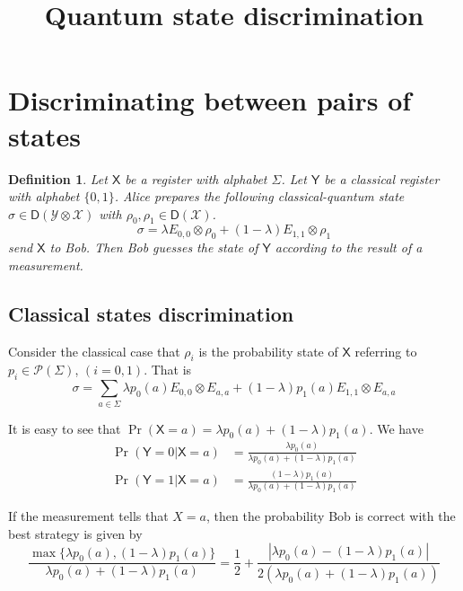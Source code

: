 \documentclass[aps,pra,onecolumn,notitlepage,superscriptaddress]{revtex4-1}
\newcommand{\reg}[1]{\mathsf{#1}}
\newcommand{\spc}[1]{\mathcal{#1}}
\newcommand{\D}{\mathsf{D}}
\newtheorem{defi}{Definition}
\begin{document}
    \title{Quantum state discrimination}
    \author{}
    \maketitle

    \section{Discriminating between pairs of states}
    \begin{defi}
        Let $\reg{X}$ be a register with alphabet $\Sigma$. Let $\reg{Y}$ be a classical register with alphabet $\{0,1\}$.
        Alice prepares the following classical-quantum state $\sigma \in \D( \spc Y \otimes \spc X )$ with $\rho_0, \rho_1 \in \D(\spc X)$.
        \begin{equation}
            \sigma = \lambda E_{0,0} \otimes \rho_0 + (1-\lambda) E_{1,1} \otimes \rho_1
        \end{equation}
       send $\reg X$ to Bob. Then Bob guesses the state of $\reg{Y}$ according to the result of a measurement.
    \end{defi}
    
    \subsection{Classical states discrimination}
    Consider the classical case that $\rho_i$ is the probability state of $\reg{X}$ referring to $p_i \in \spc{P}(\Sigma)$, $(i=0,1)$. That is
    \begin{equation}
        \sigma = \sum_{a \in \Sigma} \lambda p_0(a) E_{0,0} \otimes E_{a,a} + (1-\lambda) p_1(a) E_{1,1} \otimes E_{a,a}
    \end{equation}

    It is easy to see that $\Pr(\reg{X} = a) = \lambda p_0(a) + (1-\lambda)p_1(a)$. We have
    \begin{align}
        \Pr(\reg{Y} = 0 | \reg{X} = a) &= \frac{\lambda p_0(a)}{\lambda p_0(a)+(1-\lambda) p_1(a)} \\
        \Pr(\reg{Y} = 1 | \reg{X} = a) &= \frac{(1-\lambda) p_1(a)}{\lambda p_0(a)+(1-\lambda) p_1(a)}
    \end{align}

    If the measurement tells that $X = a$, then the probability Bob is correct with the best strategy is given by
    \begin{equation}
        \frac{
            \max\{\lambda p_0(a), (1-\lambda) p_1(a)\}
        }
        {\lambda p_0(a)+(1-\lambda) p_1(a)} = \frac{1}{2} + \frac{|\lambda p_0(a) - (1-\lambda) p_1(a)|}{2(\lambda p_0(a)+(1-\lambda) p_1(a))}
    \end{equation}
\end{document}

